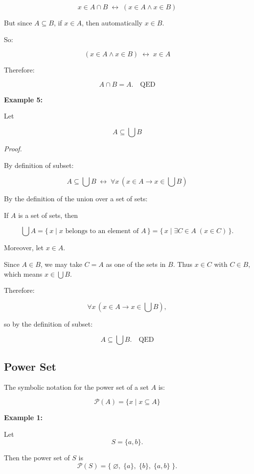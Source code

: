 \documentclass[12pt,a4paper,openany]{article}
\begin{document}
\[
x \in A \cap B 
\;\leftrightarrow\;
(x \in A \land x \in B)
\]

But since $A \subseteq B$, if $x \in A$, then automatically $x \in B$.  

So:

\[
(x \in A \land x \in B) \;\leftrightarrow\; x \in A
\]

Therefore:

\[
\boxed{A \cap B = A. \quad \text{QED}}
\]

\textbf{Example 5:}

Let 

\[
A \subseteq \displaystyle\bigcup B
\]

\textit{Proof.}

By definition of subset:  

\[
A \subseteq \displaystyle\bigcup B \;\leftrightarrow\; \forall x \,(x \in A \to x \in \bigcup B)
\]  

By the definition of the union over a set of sets:

If $A$ is a set of sets, then  

\[
\displaystyle\bigcup A = \{\, x \mid x \text{ belongs to an element of } A \,\} 
= \{\, x \mid \exists C \in A \; (x \in C) \,\}.
\]  

Moreover, let $x \in A$.  

Since $A \in B$, we may take $C = A$ as one of the sets in $B$. Thus $x \in C$ with $C \in B$, which means $x \in \displaystyle\bigcup B$.  

Therefore:  

\[
\forall x \,(x \in A \to x \in \displaystyle\bigcup B),
\]  

so by the definition of subset:  

\[
\boxed{A \subseteq \displaystyle\bigcup B. \quad \text{QED}}
\]


\subsection{Power Set}\label{Power Set}

The symbolic notation for the power set of a set $A$ is:

$$
\mathcal{P}(A) = \{x \mid x \subseteq A\}
$$

\textbf{Example 1:}

Let  
\[
S = \{a, b\}.
\]  

Then the power set of $S$ is  
\[
\mathcal{P}(S) = \{\;\varnothing,\; \{a\},\; \{b\},\; \{a,b\}\;\}.
\]  
\end{document}
